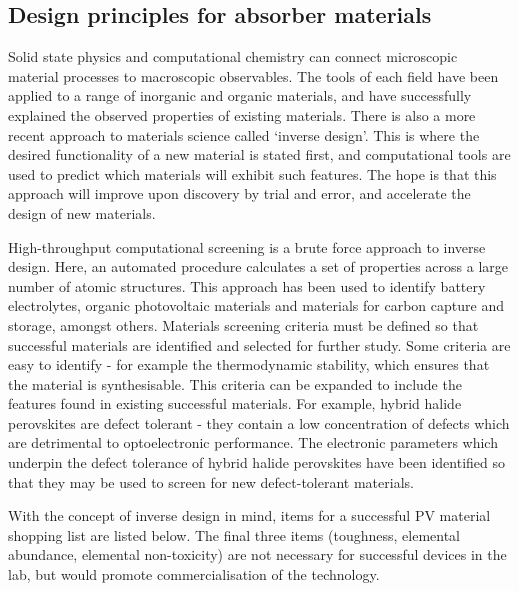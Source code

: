  \subsection{Design principles for absorber materials}
 
Solid state physics and computational chemistry can connect microscopic material processes to macroscopic observables. The tools of each field have been applied to a range of inorganic and organic materials, and have successfully explained the observed properties of existing materials.
There is also a more recent approach to materials science called `inverse design'. This is where the desired functionality of a new material is stated first, and computational tools are used to predict which materials will exhibit such features.\autocite{Zunger2018}
The hope is that this approach will improve upon discovery by trial and error, and accelerate the design of new materials.

High-throughput computational screening is a brute force approach to inverse design. Here, an automated procedure calculates a set of properties across a large number of atomic structures. This approach has been used to identify battery electrolytes,\autocite{Qu2015} organic photovoltaic materials\autocite{Hachmann2011} and materials for carbon capture and storage,\autocite{Dunstan2016} amongst others. 
Materials screening criteria must be defined so that successful materials are identified and selected for further study. Some criteria are easy to identify - for example the thermodynamic stability, which ensures that the material is synthesisable. This criteria can be expanded to include the features found in existing successful materials. For example, hybrid halide perovskites are defect tolerant - they contain a low concentration of defects which are detrimental to optoelectronic performance. The electronic parameters which underpin the defect tolerance of hybrid halide perovskites have been identified so that they may be used to screen for new defect-tolerant materials.\autocite{Brandt2015} 

With the concept of inverse design in mind, items for a successful PV material shopping list are listed below. The final three items (toughness, elemental abundance, elemental non-toxicity) are not necessary for successful devices in the lab, but would promote commercialisation of the technology.


